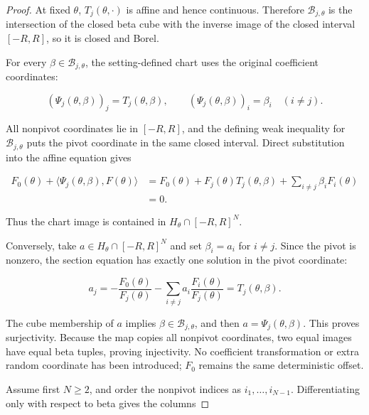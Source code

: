 \begin{proof}
At fixed \(\theta\), \(T_j(\theta,\cdot)\) is affine and hence continuous.
Therefore \(\mathcal B_{j,\theta}\) is the intersection of the closed beta cube with the inverse image of the
closed interval \([-R,R]\), so it is closed and Borel.

For every \(\beta\in\mathcal B_{j,\theta}\), the setting-defined chart uses the original coefficient
coordinates:

\begin{equation}
\label{eq:appendix-display-111}
(\Psi_j(\theta,\beta))_j=T_j(\theta,\beta),
\qquad
(\Psi_j(\theta,\beta))_i=\beta_i\quad(i\neq j).
\end{equation}

All nonpivot coordinates lie in \([-R,R]\), and the defining weak inequality for
\(\mathcal B_{j,\theta}\) puts the pivot coordinate in the same closed interval. Direct substitution into
the affine equation gives

\begin{equation}
\label{eq:appendix-display-112}
\begin{aligned}
F_0(\theta)+\langle\Psi_j(\theta,\beta),F(\theta)\rangle
&=F_0(\theta)+F_j(\theta)T_j(\theta,\beta)
+\sum_{i\neq j}\beta_iF_i(\theta)\\
&=0.
\end{aligned}
\end{equation}

Thus the chart image is contained in \(H_\theta\cap[-R,R]^N\).

Conversely, take \(a\in H_\theta\cap[-R,R]^N\) and set \(\beta_i=a_i\) for \(i\neq j\). Since the pivot
is nonzero, the section equation has exactly one solution in the pivot coordinate:

\begin{equation}
\label{eq:appendix-display-113}
a_j
=-\frac{F_0(\theta)}{F_j(\theta)}
-\sum_{i\neq j}a_i\frac{F_i(\theta)}{F_j(\theta)}
=T_j(\theta,\beta).
\end{equation}

The cube membership of \(a\) implies \(\beta\in\mathcal B_{j,\theta}\), and then
\(a=\Psi_j(\theta,\beta)\). This proves surjectivity. Because the map copies all nonpivot coordinates, two
equal images have equal beta tuples, proving injectivity. No coefficient transformation or extra random
coordinate has been introduced; \(F_0\) remains the same deterministic offset.

Assume first \(N\geq2\), and order the nonpivot indices as \(i_1,\ldots,i_{N-1}\). Differentiating only with
respect to beta gives the columns


\end{proof}
